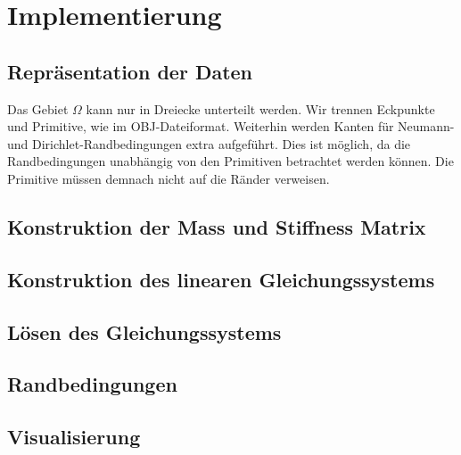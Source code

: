 \documentclass[crop=false,10pt,ngerman]{standalone}
\begin{document}
  \section{Implementierung} %
  \label{sec:implementierung}

    \subsection{Repräsentation der Daten} %
    \label{sub:repräsentation_der_daten}
      Das Gebiet $\Omega$ kann nur in Dreiecke unterteilt werden.
      Wir trennen Eckpunkte und Primitive, wie im OBJ-Dateiformat.
      Weiterhin werden Kanten für Neumann- und Dirichlet-Randbedingungen extra aufgeführt.
      Dies ist möglich, da die Randbedingungen unabhängig von den Primitiven betrachtet werden können.
      Die Primitive müssen demnach nicht auf die Ränder verweisen.
      \cite{Alberty1998}

    \subsection{Konstruktion der Mass und Stiffness Matrix} %
    \label{sub:konstruktion_der_mass_und_stiffness_matrix}


    \subsection{Konstruktion des linearen Gleichungssystems} %
    \label{sub:konstruktion_des_linearen_gleichungssystems}


    \subsection{Lösen des Gleichungssystems} %
    \label{sub:lösen_des_gleichungssystems}


    \subsection{Randbedingungen} %
    \label{sub:randbedingungen}


    \subsection{Visualisierung} %
    \label{sub:visualisierung}

\end{document}
